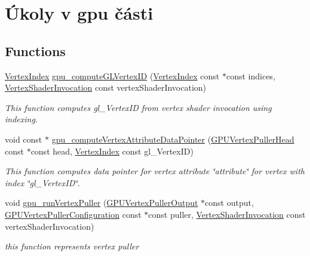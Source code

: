 \hypertarget{group__gpu__side}{\section{Úkoly v gpu části}
\label{group__gpu__side}
}
\subsection*{Functions}
\begin{DoxyCompactItemize}
\item 
\hyperlink{fwd_8h_a83b6b93a31d7fa3fc22f37a3a0798858}{Vertex\-Index} \hyperlink{group__gpu__side_ga3983ddd2c559c1a6d1e1f1f37be3eae0}{gpu\-\_\-compute\-G\-L\-Vertex\-I\-D} (\hyperlink{fwd_8h_a83b6b93a31d7fa3fc22f37a3a0798858}{Vertex\-Index} const $\ast$const indices, \hyperlink{fwd_8h_a3a23f024b4270ea7139910001f477346}{Vertex\-Shader\-Invocation} const vertex\-Shader\-Invocation)
\begin{DoxyCompactList}\small\item\em This function computes gl\-\_\-\-Vertex\-I\-D from vertex shader invocation using indexing. \end{DoxyCompactList}\item 
void const $\ast$ \hyperlink{group__gpu__side_ga4b894f26ed3c06346da10fc6c41f90eb}{gpu\-\_\-compute\-Vertex\-Attribute\-Data\-Pointer} (\hyperlink{structGPUVertexPullerHead}{G\-P\-U\-Vertex\-Puller\-Head} const $\ast$const head, \hyperlink{fwd_8h_a83b6b93a31d7fa3fc22f37a3a0798858}{Vertex\-Index} const gl\-\_\-\-Vertex\-I\-D)
\begin{DoxyCompactList}\small\item\em This function computes data pointer for vertex attribute \char`\"{}attribute\char`\"{} for vertex with index \char`\"{}gl\-\_\-\-Vertex\-I\-D\char`\"{}. \end{DoxyCompactList}\item 
void \hyperlink{group__gpu__side_ga0e0c36548db12eea1e6d512b9f855a1c}{gpu\-\_\-run\-Vertex\-Puller} (\hyperlink{structGPUVertexPullerOutput}{G\-P\-U\-Vertex\-Puller\-Output} $\ast$const output, \hyperlink{structGPUVertexPullerConfiguration}{G\-P\-U\-Vertex\-Puller\-Configuration} const $\ast$const puller, \hyperlink{fwd_8h_a3a23f024b4270ea7139910001f477346}{Vertex\-Shader\-Invocation} const vertex\-Shader\-Invocation)
\begin{DoxyCompactList}\small\item\em this function represents vertex puller \end{DoxyCompactList}\item 

\end{DoxyCompactItemize}
